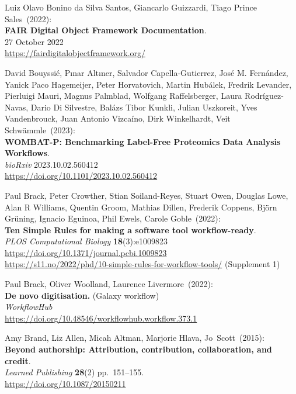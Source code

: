 \begin{thebibliography}{9}
Luiz Olavo Bonino da Silva Santos, Giancarlo Guizzardi, Tiago Prince Sales~(2022): \\
\textbf{FAIR Digital Object Framework Documentation}. \\
27 October 2022\\
\url{https://fairdigitalobjectframework.org/}

David Bouyssié, Pınar Altıner, Salvador Capella-Gutierrez, José M. Fernández, Yanick Paco Hagemeijer, Peter Horvatovich, Martin Hubálek, Fredrik Levander, Pierluigi Mauri, Magnus Palmblad, Wolfgang Raffelsberger, Laura Rodríguez-Navas, Dario Di Silvestre, Balázs Tibor Kunkli, Julian Uszkoreit, Yves Vandenbrouck, Juan Antonio Vizcaíno, Dirk Winkelhardt, Veit Schwämmle~(2023): \\
\textbf{WOMBAT-P: Benchmarking Label-Free Proteomics Data Analysis Workflows}.\\
\emph{bioRxiv} 2023.10.02.560412 \\
\url{https://doi.org/10.1101/2023.10.02.560412}


Paul Brack, Peter Crowther, Stian Soiland-Reyes, Stuart Owen, Douglas Lowe, Alan R Williams, Quentin Groom, Mathias Dillen, Frederik Coppens, Björn Grüning, Ignacio Eguinoa, Phil Ewels, Carole Goble~(2022): \\
\textbf{Ten Simple Rules for making a software tool workflow-ready}.\\
\emph{PLOS Computational Biology} \textbf{18}(3):e1009823\\
\url{https://doi.org/10.1371/journal.pcbi.1009823}\\
\url{https://s11.no/2022/phd/10-simple-rules-for-workflow-tools/}
(Supplement 1)

Paul Brack, Oliver Woolland, Laurence Livermore~(2022): \\
\textbf{De novo digitisation.} (Galaxy workflow)\\
\emph{WorkflowHub}\\
\url{https://doi.org/10.48546/workflowhub.workflow.373.1}

Amy Brand, Liz Allen, Micah Altman, Marjorie Hlava, Jo~Scott~(2015): \\
\textbf{Beyond authorship: Attribution, contribution, collaboration, and credit}.\\
\emph{Learned Publishing} \textbf{28}(2) pp.~151--155.\\
\url{https://doi.org/10.1087/20150211}


\end{thebibliography}
